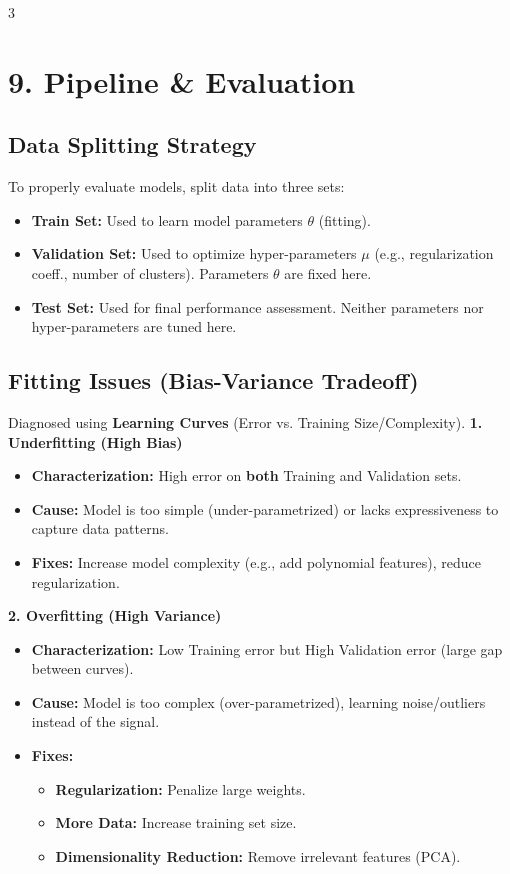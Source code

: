 \documentclass[10pt, a4paper, landscape]{article}
\begin{document}
\begin{multicols*}{3}
\section{9. Pipeline \& Evaluation}
\subsection{Data Splitting Strategy}
To properly evaluate models, split data into three sets:
\begin{itemize}
\item \textbf{Train Set:} Used to learn model parameters $\theta$ (fitting).
\item \textbf{Validation Set:} Used to optimize hyper-parameters $\mu$ (e.g., regularization coeff., number of clusters). Parameters $\theta$ are fixed here.
\item \textbf{Test Set:} Used for final performance assessment. Neither parameters nor hyper-parameters are tuned here.
\end{itemize}

\subsection{Fitting Issues (Bias-Variance Tradeoff)}
Diagnosed using \textbf{Learning Curves} (Error vs. Training Size/Complexity).
\textbf{1. Underfitting (High Bias)}
\begin{itemize}
\item \textbf{Characterization:} High error on \textbf{both} Training and Validation sets.
\item \textbf{Cause:} Model is too simple (under-parametrized) or lacks expressiveness to capture data patterns.
\item \textbf{Fixes:} Increase model complexity (e.g., add polynomial features), reduce regularization.
\end{itemize}

\textbf{2. Overfitting (High Variance)}
\begin{itemize}
\item \textbf{Characterization:} Low Training error but High Validation error (large gap between curves).
\item \textbf{Cause:} Model is too complex (over-parametrized), learning noise/outliers instead of the signal.
\item \textbf{Fixes:}
\begin{itemize}
\item \textbf{Regularization:} Penalize large weights.
\item \textbf{More Data:} Increase training set size.
\item \textbf{Dimensionality Reduction:} Remove irrelevant features (PCA).
\end{itemize}
\end{itemize}


\end{multicols*}
\end{document}
